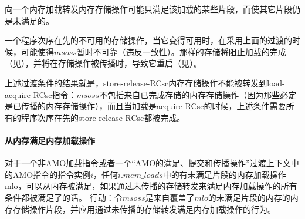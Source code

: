 \begin{commentary}
  向一个内存加载转发内存存储操作可能只满足该加载的某些片段，而使其它片段仍是未满足的。

一个程序次序在先的不可用的存储操作，当它变得可用时，在采用上面的过渡的时候，可能使得$msoss$暂时不可靠（违反一致性）。那样的存储将阻止加载的完成（见），并将在存储操作被传播时，导致它重启（见）。

上述过渡条件的结果就是，store-release-RCsc内存存储操作不能被转发到load-acquire-RCsc指令：$msoss$不包括来自已完成存储的内存存储操作（因为那些必定是已传播的内存存储操作），而且当加载是acquire-RCsc的时候，上述条件需要所有的程序次序在先的store-release-RCsc都被完成。
\end{commentary}


\paragraph{从内存满足内存加载操作}\label{omm:sat_from_mem}
对于一个非AMO加载指令或者一个“AMO的满足、提交和传播操作”过渡上下文中的AMO指令的指令实例$i$，任何$i.\textit{mem\_loads}$中的有未满足片段的内存加载操作mlo，可以从内存被满足，如果通过未传播的存储转发来满足内存加载操作的所有条件都被满足了的话。
行动：令$msoss$是来自覆盖了$mlo$的未满足片段的内存的内存存储操作片段，并应用通过未传播的存储转发满足内存加载操作的行为。

